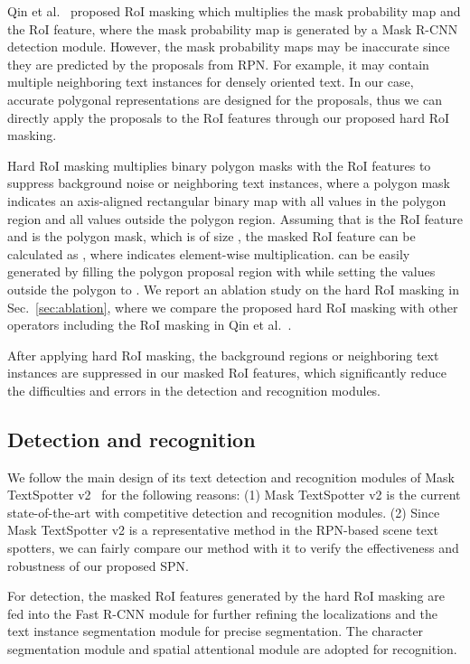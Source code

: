 \documentclass[runningheads]{llncs}
\begin{document}
Qin et al.~\cite{qin2019towards} proposed RoI masking which multiplies the mask probability map and the RoI feature, where the mask probability map is generated by a Mask R-CNN detection module. However, the mask probability maps may be inaccurate since they are predicted by the proposals from RPN. For example, it may contain multiple neighboring text instances for densely oriented text. In our case, accurate polygonal representations are designed for the proposals, thus we can directly apply the proposals to the RoI features through our proposed hard RoI masking.

Hard RoI masking multiplies binary polygon masks with the RoI features to suppress background noise or neighboring text instances, where a polygon mask  indicates an axis-aligned rectangular binary map with all  values in the polygon region and all  values outside the polygon region. Assuming that  is the RoI feature and  is the polygon mask, which is of size , the masked RoI feature  can be calculated as ,
where  indicates element-wise multiplication.  can be easily generated by filling the polygon proposal region with  while setting the values outside the polygon to . We report an ablation study on the hard RoI masking in Sec.~\ref{sec:ablation}, where we compare the proposed hard RoI masking with other operators including the RoI masking in Qin et al.~\cite{qin2019towards}.

After applying hard RoI masking, the background regions or neighboring text instances are suppressed in our masked RoI features, which significantly reduce the difficulties and errors in the detection and recognition modules.

\subsection{Detection and recognition}
We follow the main design of its text detection and recognition modules of Mask TextSpotter v2~\cite{liao2019mask} for the following reasons: (1) Mask TextSpotter v2 is the current state-of-the-art with competitive detection and recognition modules. (2) Since Mask TextSpotter v2 is a representative method in the RPN-based scene text spotters, we can fairly compare our method with it to verify the effectiveness and robustness of our proposed SPN.

For detection, the masked RoI features generated by the hard RoI masking are fed into the Fast R-CNN module for further refining the localizations and the text instance segmentation module for precise segmentation. The character segmentation module and spatial attentional module are adopted for recognition.
\end{document}
